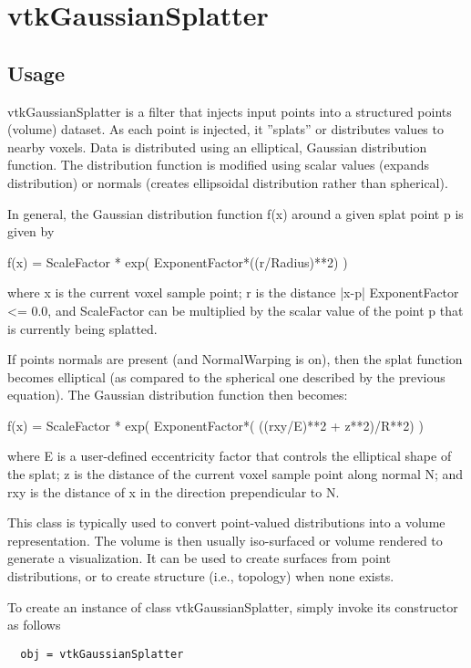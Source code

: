 \section{vtkGaussianSplatter}

\subsection{Usage}

 vtkGaussianSplatter is a filter that injects input points into a
 structured points (volume) dataset. As each point is injected, it ''splats''
 or distributes values to nearby voxels. Data is distributed using an
 elliptical, Gaussian distribution function. The distribution function is
 modified using scalar values (expands distribution) or normals
 (creates ellipsoidal distribution rather than spherical).

 In general, the Gaussian distribution function f(x) around a given
 splat point p is given by

     f(x) = ScaleFactor * exp( ExponentFactor*((r/Radius)**2) )

 where x is the current voxel sample point; r is the distance |x-p|
 ExponentFactor <= 0.0, and ScaleFactor can be multiplied by the scalar 
 value of the point p that is currently being splatted.

 If points normals are present (and NormalWarping is on), then the splat 
 function becomes elliptical (as compared to the spherical one described
 by the previous equation). The Gaussian distribution function then
 becomes:
 
     f(x) = ScaleFactor * 
               exp( ExponentFactor*( ((rxy/E)**2 + z**2)/R**2) )

 where E is a user-defined eccentricity factor that controls the elliptical
 shape of the splat; z is the distance of the current voxel sample point
 along normal N; and rxy is the distance of x in the direction
 prependicular to N.

 This class is typically used to convert point-valued distributions into
 a volume representation. The volume is then usually iso-surfaced or
 volume rendered to generate a visualization. It can be used to create
 surfaces from point distributions, or to create structure (i.e.,
 topology) when none exists.

To create an instance of class vtkGaussianSplatter, simply
invoke its constructor as follows
\begin{verbatim}
  obj = vtkGaussianSplatter
\end{verbatim}
